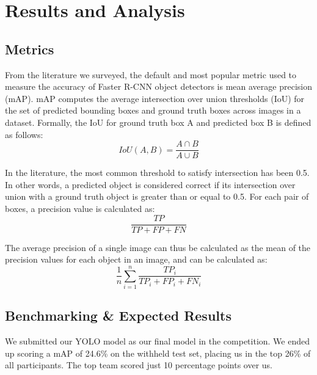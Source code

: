 \documentclass[conference]{IEEEtran}
\begin{document}
\section{Results and Analysis} \label{results_and_analysis}
\subsection{Metrics}
From the literature we surveyed, the default and most popular metric used to measure the accuracy of Faster R-CNN object detectors is mean average precision (mAP). mAP computes the average intersection over union thresholds (IoU) for the set of predicted bounding boxes and ground truth boxes across images in a dataset. Formally, the IoU for ground truth box A and predicted box B is defined as follows: \[IoU(A,B) = \frac{A \cap B}{A \cup B} \]

In the literature, the most common threshold to satisfy intersection has been 0.5. In other words, a predicted object is considered correct if its intersection over union with a ground truth object is greater than or equal to 0.5. For each pair of boxes, a precision value is calculated as: \[ \frac{TP}{TP+FP+FN} \]

The average precision of a single image can thus be calculated as the mean of the precision values for each object in an image, and can be calculated as: \[ \frac{1}{n} \sum_{i=1}^{n}\frac{TP_i}{TP_i+FP_i+FN_i} \]

\subsection{Benchmarking & Expected Results}
We submitted our YOLO model as our final model in the competition. We ended up scoring a mAP of 24.6\% on the withheld test set, placing us in the top 26\% of all participants. The top team scored just 10 percentage points over us.
\end{document}
